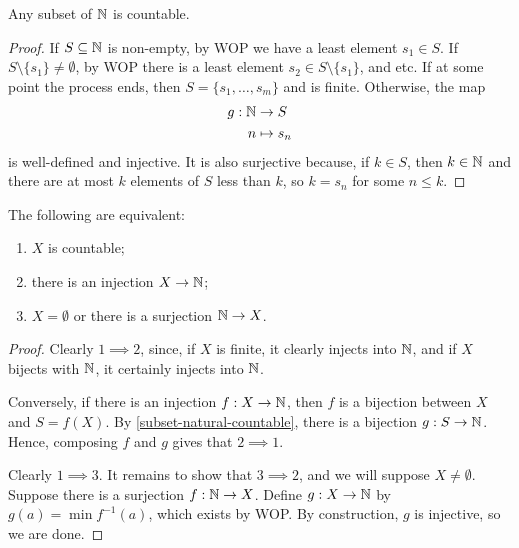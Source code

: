 \documentclass{../template/note}
\begin{document}
    \begin{lemma}
        \label{subset-natural-countable}
        Any subset of \(\mathbb N\) is countable.
    \end{lemma}
    
    \begin{proof}
        If \(S \subseteq \mathbb N\) is non-empty, by WOP we have a least element \(s_1 \in S\). If \(S \setminus \{s_1\} \neq \emptyset\), by WOP there is a least element \(s_2 \in S \setminus \{s_1\}\), and etc. If at some point the process ends, then \(S = \{s_1, \dots, s_m\}\) and is finite. Otherwise, the map
        \begin{align*}
            g: \mathbb N &\to S \\
            n &\mapsto s_n
        \end{align*}
        is well-defined and injective. It is also surjective because, if \(k \in S\), then \(k \in \mathbb N\) and there are at most \(k\) elements of \(S\) less than \(k\), so \(k = s_n\) for some \(n \leq k\).
        
    \end{proof}
    

    \begin{theorem}
        The following are equivalent:
        \begin{enumerate}
            \item \(X\) is countable;
            \item there is an injection \(X \to \mathbb N\);
            \item \(X = \emptyset\) or there is a surjection \(\mathbb N \to X\).
        \end{enumerate}
    \end{theorem}
    
    \begin{proof}
        Clearly \(1 \implies 2\), since, if \(X\) is finite, it clearly injects into \(\mathbb N\), and if \(X\) bijects with \(\mathbb N\), it certainly injects into \(\mathbb N\). 

        Conversely, if there is an injection \(f: X \to \mathbb N\), then \(f\) is a bijection between \(X\) and \(S = f(X)\). By \cref{subset-natural-countable}, there is a bijection \(g: S \to \mathbb N\). Hence, composing \(f\) and \(g\) gives that \(2 \implies 1\).

        Clearly \(1 \implies 3\). It remains to show that \(3 \implies 2\), and we will suppose \(X \neq \emptyset\). Suppose there is a surjection \(f: \mathbb N \to X\). Define \(g: X \to \mathbb N\) by \(g(a) = \min f^{-1}(a)\), which exists by WOP. By construction, \(g\) is injective, so we are done.
    \end{proof}
    
\end{document}
